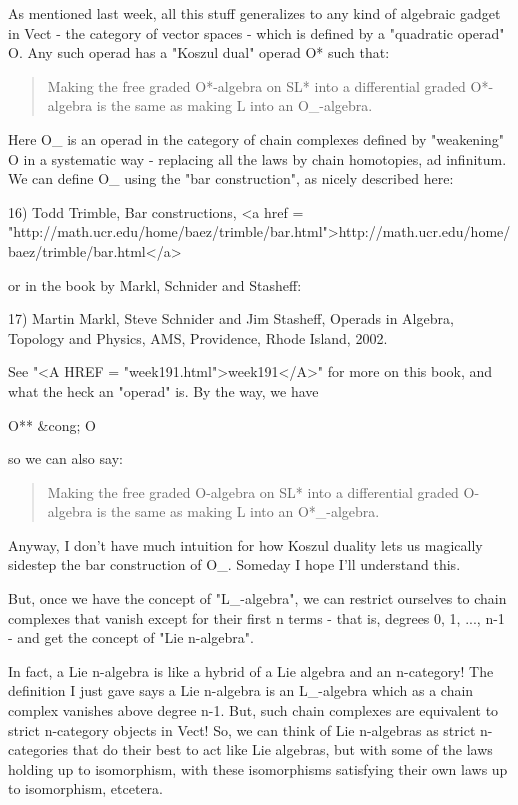 As mentioned last week, all this stuff generalizes to any kind of
algebraic gadget in Vect - the category of vector spaces - which is
defined by a "quadratic operad" O.  Any such operad has a
"Koszul dual" operad O* such that:

\begin{quote}
 Making the free graded O*-algebra on SL* into a differential
 graded O*-algebra is the same as making L into an O_{\infty }-algebra.
\end{quote}

Here O_{\infty } is an operad in the category of chain complexes
defined by "weakening" O in a systematic way - replacing all the
laws by chain homotopies, ad infinitum.  We can define O_{\infty }
using the "bar construction", as nicely described here:

16) Todd Trimble, Bar constructions,
<a href = "http://math.ucr.edu/home/baez/trimble/bar.html">http://math.ucr.edu/home/baez/trimble/bar.html</a>

or in the book by Markl, Schnider and Stasheff:

17) Martin Markl, Steve Schnider and Jim Stasheff, Operads in 
Algebra, Topology and Physics, AMS, Providence, Rhode Island, 2002.

See "<A HREF = "week191.html">week191</A>" for more on this
book, and what the heck an "operad" is.  By the way, we have

O** &cong; O

so we can also say:

\begin{quote}
 Making the free graded O-algebra on SL* into a differential
 graded O-algebra is the same as making L into an O*_{\infty }-algebra.
\end{quote}



Anyway, I don't have much intuition for how Koszul duality lets
us magically sidestep the bar construction of O_{\infty }. Someday
I hope I'll understand this.

But, once we have the concept of "L_{\infty }-algebra", 
we can restrict ourselves to chain complexes that
vanish except for their first n terms - that is, degrees 0, 1, ...,
n-1 - and get the concept of "Lie n-algebra".

In fact, a Lie n-algebra is like a hybrid of a Lie algebra and an
n-category!  The definition I just gave says a Lie n-algebra is 
an L_{\infty }-algebra which as a chain complex vanishes above 
degree n-1.  But, such chain complexes are equivalent to strict 
n-category objects in Vect!  So, we can think of Lie n-algebras as 
strict n-categories that do their best to act like Lie algebras, but 
with some of the laws holding up to isomorphism, with these isomorphisms 
satisfying their own laws up to isomorphism, etcetera.  


